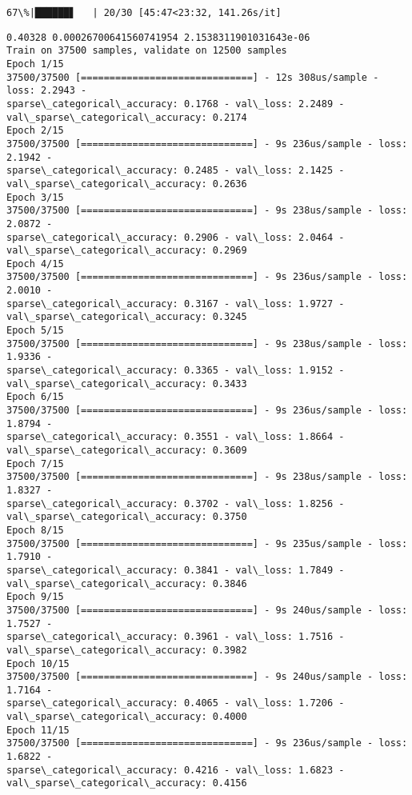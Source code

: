 \documentclass[11pt]{article}
\begin{document}
    \begin{Verbatim}[commandchars=\\\{\}]
 67\%|██████▋   | 20/30 [45:47<23:32, 141.26s/it]
    \end{Verbatim}

    \begin{Verbatim}[commandchars=\\\{\}]
0.40328 0.00026700641560741954 2.1538311901031643e-06
Train on 37500 samples, validate on 12500 samples
Epoch 1/15
37500/37500 [==============================] - 12s 308us/sample - loss: 2.2943 -
sparse\_categorical\_accuracy: 0.1768 - val\_loss: 2.2489 -
val\_sparse\_categorical\_accuracy: 0.2174
Epoch 2/15
37500/37500 [==============================] - 9s 236us/sample - loss: 2.1942 -
sparse\_categorical\_accuracy: 0.2485 - val\_loss: 2.1425 -
val\_sparse\_categorical\_accuracy: 0.2636
Epoch 3/15
37500/37500 [==============================] - 9s 238us/sample - loss: 2.0872 -
sparse\_categorical\_accuracy: 0.2906 - val\_loss: 2.0464 -
val\_sparse\_categorical\_accuracy: 0.2969
Epoch 4/15
37500/37500 [==============================] - 9s 236us/sample - loss: 2.0010 -
sparse\_categorical\_accuracy: 0.3167 - val\_loss: 1.9727 -
val\_sparse\_categorical\_accuracy: 0.3245
Epoch 5/15
37500/37500 [==============================] - 9s 238us/sample - loss: 1.9336 -
sparse\_categorical\_accuracy: 0.3365 - val\_loss: 1.9152 -
val\_sparse\_categorical\_accuracy: 0.3433
Epoch 6/15
37500/37500 [==============================] - 9s 236us/sample - loss: 1.8794 -
sparse\_categorical\_accuracy: 0.3551 - val\_loss: 1.8664 -
val\_sparse\_categorical\_accuracy: 0.3609
Epoch 7/15
37500/37500 [==============================] - 9s 238us/sample - loss: 1.8327 -
sparse\_categorical\_accuracy: 0.3702 - val\_loss: 1.8256 -
val\_sparse\_categorical\_accuracy: 0.3750
Epoch 8/15
37500/37500 [==============================] - 9s 235us/sample - loss: 1.7910 -
sparse\_categorical\_accuracy: 0.3841 - val\_loss: 1.7849 -
val\_sparse\_categorical\_accuracy: 0.3846
Epoch 9/15
37500/37500 [==============================] - 9s 240us/sample - loss: 1.7527 -
sparse\_categorical\_accuracy: 0.3961 - val\_loss: 1.7516 -
val\_sparse\_categorical\_accuracy: 0.3982
Epoch 10/15
37500/37500 [==============================] - 9s 240us/sample - loss: 1.7164 -
sparse\_categorical\_accuracy: 0.4065 - val\_loss: 1.7206 -
val\_sparse\_categorical\_accuracy: 0.4000
Epoch 11/15
37500/37500 [==============================] - 9s 236us/sample - loss: 1.6822 -
sparse\_categorical\_accuracy: 0.4216 - val\_loss: 1.6823 -
val\_sparse\_categorical\_accuracy: 0.4156

\end{Verbatim}
\end{document}

